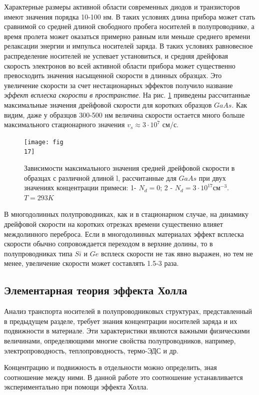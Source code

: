 Характерные размеры активной области современных диодов и транзисторов имеют значения порядка 10-100 нм. В таких условиях длина прибора может стать сравнимой со средней длиной свободного пробега носителей в полупроводнике, а время пролета может оказаться примерно равным или меньше среднего времени релаксации энергии и импульса носителей заряда. В таких условиях равновесное распределение носителей не успевает установиться, и средняя дрейфовая скорость электронов во всей активной области прибора может существенно превосходить значения насыщенной скорости в длинных образцах. Это увеличение скорости за счет нестационарных эффектов получило название \textit{эффект всплеска скорости в пространстве}. На рис. \ref{fig:7} приведены рассчитанные максимальные значения дрейфовой скорости для коротких образцов $GaAs$. Как видим, даже у образцов 300-500 нм величина скорости остается много больше максимального стационарного значения $v_s \approx 3\cdot 10^7$ см/с.
\begin{figure}[h!]
	\centering
	\texttt{[image: fig\\17]}
	\caption{Зависимости максимального значения средней дрейфовой скорости в образцах с различной длиной l, рассчитанные для $GaAs$ при двух значениях концентрации примеси: 1- $N_d=0$; 2 - $N_d=3\cdot 10^{17} \text{см}^{-3}$. $T=293 K$}
	\label{fig:7}
\end{figure}

В многодолинных полупроводниках, как и в стационарном случае, на динамику дрейфовой скорости на коротких отрезках времени существенно влияет междолинного переброса. Если в многодолинных материалах эффект всплеска скорости обычно сопровождается переходом в верхние долины, то в полупроводниках типа $Si$ и $Ge$ всплеск скорости не так явно выражен, но тем не менее, увеличение скорости может составлять 1.5-3 раза.

\subsection{Элементарная теория эффекта Холла}
Анализ транспорта носителей в полупроводниковых структурах, представленный в предыдущем разделе, требует знания концентрации носителей заряда и их подвижности в материале. Эти характеристики являются важными физическими величинами, определяющими многие свойства полупроводников, например, электропроводность, теплопроводность, термо-ЭДС и др.

Концентрацию и подвижность в отдельности можно определить, зная соотношение между ними. В данной работе это соотношение устанавливается экспериментально при помощи эффекта Холла.

